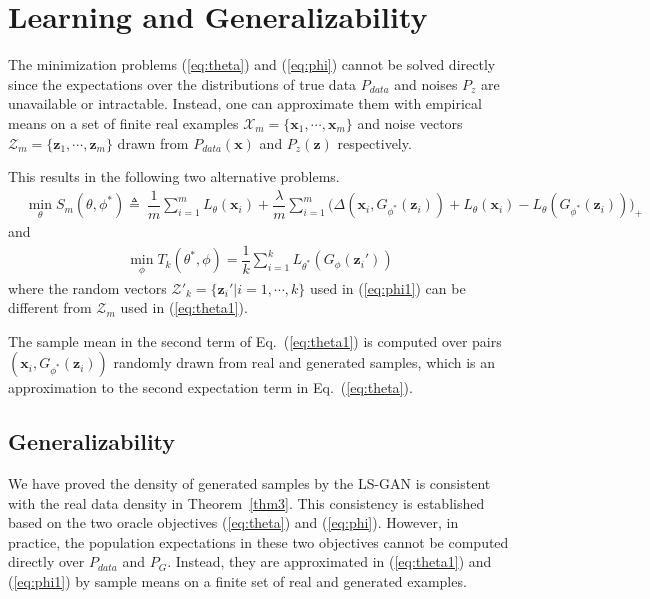 \documentclass[11pt,fullpage, letterpaper,twoside]{article}
\newcommand{\1}[1]{\mathds{1}_{\left[#1\right]}}
\begin{document}
\section{Learning and Generalizability}\label{sec:alg}
The minimization problems (\ref{eq:theta}) and (\ref{eq:phi}) cannot be solved directly since the expectations over the distributions of true data $P_{data}$ and noises $P_z$ are unavailable or intractable.  Instead, one can approximate them with empirical means on a set of finite real examples $\mathcal X_m=\{\mathbf x_1,\cdots,\mathbf x_m\}$ and noise vectors $\mathcal Z_m=\{\mathbf z_1,\cdots,\mathbf z_m\}$ drawn from $P_{data}(\mathbf x)$ and $P_z(\mathbf z)$ respectively.

This results in the following two alternative problems.
\begin{align}\label{eq:theta1}
&\min_{\theta} S_{m} (\theta,\phi^*) \triangleq ~\dfrac{1}{m} \sum_{i=1}^m {L_\theta(\mathbf x_i)}
+ \dfrac{\lambda}{m} \sum_{i=1}^{m} \big( \Delta(\mathbf x_i,G_{\phi^*}(\mathbf z_i)) + L_\theta(\mathbf x_i) - L_\theta(G_{\phi^*}(\mathbf z_i)) \big)_+\end{align}
and
\begin{equation}\label{eq:phi1}
\begin{aligned}
\min_{\phi} T_k(\theta^*,\phi)=\dfrac{1}{k} \sum_{i=1}^k L_{\theta^*}(G_\phi(\mathbf z_i'))
\end{aligned}
\end{equation}
where the random vectors $\mathcal Z'_k=\{\mathbf z_i'|i=1,\cdots,k\}$ used in (\ref{eq:phi1}) can be different from $\mathcal Z_m$ used in (\ref{eq:theta1}).

The sample mean in the second term of Eq.~(\ref{eq:theta1}) is computed over pairs $(\mathbf x_i, G_{\phi^*}(\mathbf z_i))$ randomly drawn from real and generated samples, which is an approximation to the second expectation term in Eq.~(\ref{eq:theta}).










\subsection{Generalizability}\label{sec:gen}

We have proved the density of generated samples by the LS-GAN is consistent with the real data density in Theorem~\ref{thm3}. This consistency is established based on the two oracle objectives (\ref{eq:theta}) and (\ref{eq:phi}).  However, in practice, the population expectations in these two objectives cannot be computed directly over $P_{data}$ and $P_G$. Instead, they are approximated in (\ref{eq:theta1}) and (\ref{eq:phi1}) by sample means on a finite set of real and generated examples.
\end{document}
